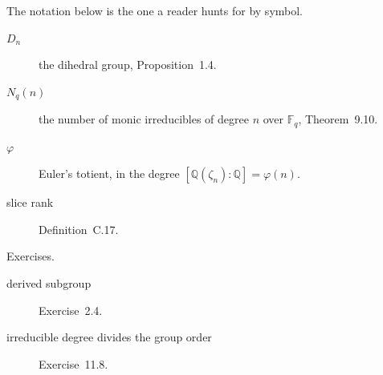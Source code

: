 \noindent The notation below is the one a reader hunts for by symbol.
\begin{description}
\item[$D_n$] the dihedral group, Proposition~1.4.
\item[$N_q(n)$] the number of monic irreducibles of degree $n$ over $\mathbb F_q$, Theorem~9.10.
\item[$\varphi$] Euler's totient, in the degree $[\mathbb Q(\zeta_n):\mathbb Q]=\varphi(n)$.
\item[slice rank] Definition~C.17.
\end{description}

\noindent Exercises.
\begin{description}
\item[derived subgroup] Exercise~2.4.
\item[irreducible degree divides the group order] Exercise~11.8.
\end{description}
